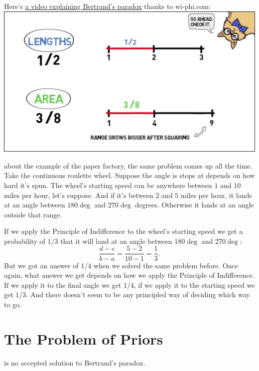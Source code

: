 \documentclass[justified]{tufte-book}
\theoremstyle{definition}
\theoremstyle{definition}
\theoremstyle{definition}
\theoremstyle{remark}
\begin{document}
\begin{marginfigure}
Here's \href{http://www.wi-phi.com/video/bertrands-paradox}{a video
explaining Bertrand's paradox} thanks to wi-phi.com:
\href{http://www.wi-phi.com/video/bertrands-paradox}{\includegraphics{img/bertrand_screengrab.png}}
\end{marginfigure}

 about the example of the paper factory, the same problem comes up all the time. Take the continuous roulette wheel. Suppose the angle is stops at depends on how hard it's spun. The wheel's starting speed can be anywhere between \(1\) and \(10\) miles per hour, let's suppose. And if it's between \(2\) and \(5\) miles per hour, it lands at an angle between \(180\deg\) and \(270\deg\) degrees. Otherwise it lands at an angle outside that range.

If we apply the Principle of Indifference to the wheel's starting speed we get a probability of \(1/3\) that it will land at an angle between \(180\deg\) and \(270\deg\):
\[ \frac{d-c}{b-a} = \frac{5-2}{10-1} = \frac{1}{3}. \]
But we got an answer of \(1/4\) when we solved the same problem before. Once again, what answer we get depends on how we apply the Principle of Indifference. If we apply it to the final angle we get \(1/4\), if we apply it to the starting speed we get \(1/3\). And there doesn't seem to be any principled way of deciding which way to go.

\hypertarget{the-problem-of-priors}{%
\section{The Problem of Priors}\label{the-problem-of-priors}}

 is no accepted solution to Bertrand's paradox.
\end{document}
